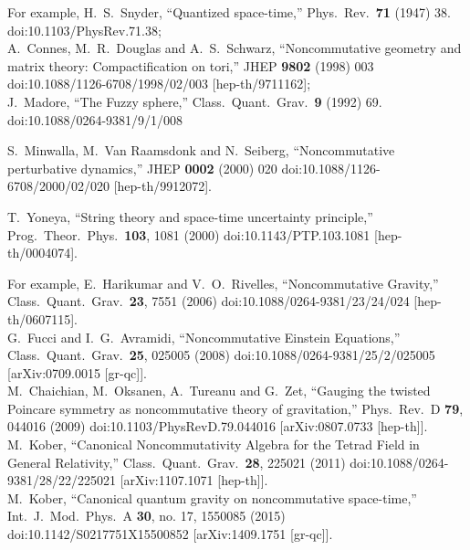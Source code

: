 \documentclass[11pt]{article}
\numberwithin{equation}{section}
\begin{document}
\begin{thebibliography}{99}

For example,
  H.~S.~Snyder,
  ``Quantized space-time,''
  Phys.\ Rev.\  {\bf 71} (1947) 38.
  doi:10.1103/PhysRev.71.38;\\
  A.~Connes, M.~R.~Douglas and A.~S.~Schwarz,
  ``Noncommutative geometry and matrix theory: Compactification on tori,''
  JHEP {\bf 9802} (1998) 003
  doi:10.1088/1126-6708/1998/02/003
  [hep-th/9711162];\\
  J.~Madore,
  ``The Fuzzy sphere,''
  Class.\ Quant.\ Grav.\  {\bf 9} (1992) 69.
  doi:10.1088/0264-9381/9/1/008

  S.~Minwalla, M.~Van Raamsdonk and N.~Seiberg,
  ``Noncommutative perturbative dynamics,''
  JHEP {\bf 0002} (2000) 020
  doi:10.1088/1126-6708/2000/02/020
  [hep-th/9912072].

  T.~Yoneya,
  ``String theory and space-time uncertainty principle,''
  Prog.\ Theor.\ Phys.\  {\bf 103}, 1081 (2000)
  doi:10.1143/PTP.103.1081
  [hep-th/0004074].



For example,
  E.~Harikumar and V.~O.~Rivelles,
``Noncommutative Gravity,''
  Class.\ Quant.\ Grav.\  {\bf 23}, 7551 (2006)
  doi:10.1088/0264-9381/23/24/024
  [hep-th/0607115].\\
  G.~Fucci and I.~G.~Avramidi,
  ``Noncommutative Einstein Equations,''
  Class.\ Quant.\ Grav.\  {\bf 25}, 025005 (2008)
  doi:10.1088/0264-9381/25/2/025005
  [arXiv:0709.0015 [gr-qc]].\\
  M.~Chaichian, M.~Oksanen, A.~Tureanu and G.~Zet,
  ``Gauging the twisted Poincare symmetry as noncommutative theory of gravitation,''
  Phys.\ Rev.\ D {\bf 79}, 044016 (2009)
  doi:10.1103/PhysRevD.79.044016
  [arXiv:0807.0733 [hep-th]].\\
  M.~Kober,
  ``Canonical Noncommutativity Algebra for the Tetrad Field in General Relativity,''
  Class.\ Quant.\ Grav.\  {\bf 28}, 225021 (2011)
  doi:10.1088/0264-9381/28/22/225021
  [arXiv:1107.1071 [hep-th]].\\
  M.~Kober,
  ``Canonical quantum gravity on noncommutative space-time,''
  Int.\ J.\ Mod.\ Phys.\ A {\bf 30}, no. 17, 1550085 (2015)
  doi:10.1142/S0217751X15500852
  [arXiv:1409.1751 [gr-qc]].



\end{thebibliography}
\end{document}
